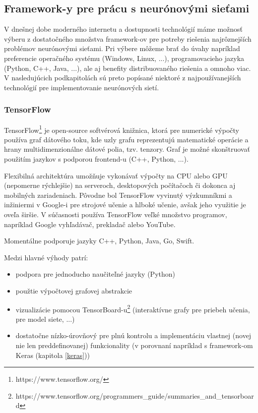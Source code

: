  
\subsection{Framework-y pre prácu s neurónovými sieťami}
V dnešnej dobe moderného internetu a dostupnosti technológií máme možnosť výberu z dostatočného množstva framework-ov pre potreby riešenia najrôznejších problémov neurónovými sieťami. Pri výbere môžeme brať do úvahy napríklad preferencie operačného systému (Windows, Linux, ...), programovacieho jazyka (Python, C++, Java, ...), ale aj benefity distribuovaného riešenia a omnoho viac. V nasledujúcich podkapitolách sú preto popísané niektoré z najpoužívanejších technológií pre implementovanie neurónových sietí. 

\subsubsection{TensorFlow}
\label{tf}
TensorFlow\footnote{https://www.tensorflow.org/} je open-source softvérová knižnica, ktorá pre numerické výpočty používa graf dátového toku, kde uzly grafu reprezentujú matematické operácie a hrany multidimenzionálne dátové polia, tzv. tenzory. Graf je možné skonštruovať použitím jazykov s podporou frontend-u (C++, Python, ...). 

Flexibilná architektúra umožňuje vykonávať výpočty na CPU alebo GPU (nepomerne rýchlejšie) na serveroch, desktopových počítačoch či dokonca aj mobilných zariadeniach. Pôvodne bol TensorFlow vyvinutý výzkumníkmi a inžiniermi v Google-i pre strojové učenie a hlboké učenie, avšak jeho využitie je oveľa širšie. V súčasnosti používa TensorFlow veľké množstvo programov, napríklad Google vyhľadávač, prekladač alebo YouTube. 

Momentálne podporuje jazyky C++, Python, Java, Go, Swift.

Medzi hlavné výhody patrí:
\begin{itemize}
	\item podpora pre jednoducho naučiteľné jazyky (Python)
	\item použtie výpočtovej grafovej abstrakcie
	\item vizualizácie pomocou TensorBoard-u\footnote{https://www.tensorflow.org/programmers\_guide/summaries\_and\_tensorboard} (interaktívne grafy pre priebeh učenia, pre model siete, ...)
	\item dostatočne nízko-úrovňový pre plnú kontrolu a implementáciu vlastnej (novej nie len preddefinovanej) funkcionality (v porovnaní napríklad s framework-om Keras (kapitola \ref{keras}))
\end{itemize}

